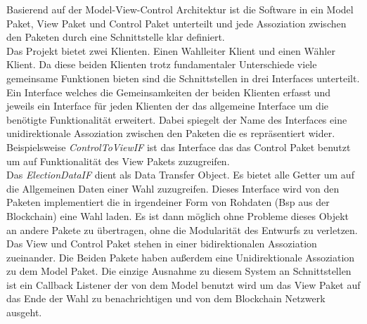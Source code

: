\documentclass[parskip=full]{scrartcl}
\newcommand{\textitx}[1]{\mbox{\textit{#1}}}
\begin{document}
	Basierend auf der Model-View-Control Architektur ist die Software in ein Model Paket, View Paket und Control Paket unterteilt und jede Assoziation zwischen den Paketen durch eine Schnittstelle klar definiert. 
	\\
	Das Projekt bietet zwei Klienten. Einen Wahlleiter Klient und einen Wähler Klient. Da diese beiden Klienten trotz fundamentaler Unterschiede viele gemeinsame Funktionen bieten sind die Schnittstellen in drei Interfaces unterteilt. Ein Interface welches die Gemeinsamkeiten der beiden Klienten erfasst und jeweils ein Interface für jeden Klienten der das allgemeine Interface um die benötigte Funktionalität erweitert. Dabei spiegelt der Name des Interfaces eine unidirektionale Assoziation zwischen den Paketen die es repräsentiert wider. Beispielsweise \textitx{ControlToViewIF} ist das Interface das das Control Paket benutzt um auf Funktionalität des View Pakets zuzugreifen.
	\\
	Das \textitx{ElectionDataIF} dient als Data Transfer Object. Es bietet alle Getter um auf die Allgemeinen Daten einer Wahl zuzugreifen. Dieses Interface wird von den Paketen implementiert die in irgendeiner Form von Rohdaten (Bsp aus der Blockchain) eine Wahl laden. Es ist dann möglich ohne Probleme dieses Objekt an andere Pakete zu übertragen, ohne die Modularität des Entwurfs zu verletzen.
	\\
	Das View und Control Paket stehen in einer bidirektionalen Assoziation zueinander. Die Beiden Pakete haben außerdem eine Unidirektionale Assoziation zu dem Model Paket. Die einzige Ausnahme zu diesem System an Schnittstellen ist ein Callback Listener der von dem Model benutzt wird um das View Paket auf das Ende der Wahl zu benachrichtigen und von dem Blockchain Netzwerk ausgeht.
	\\
\end{document}
